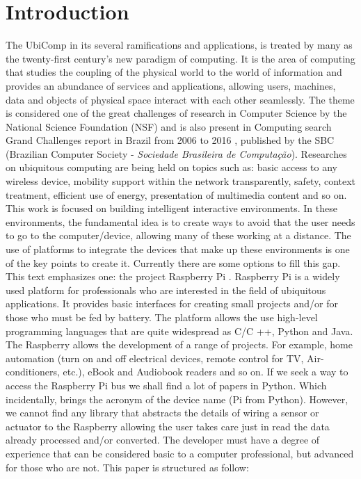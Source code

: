 \documentclass{acm_proc_article-sp}
\begin{document}
\section*{Introduction}
The UbiComp in its several ramifications and applications, is treated by many as the twenty-first century's new paradigm of computing. It is the area of computing that studies the coupling of the physical world to the world of information and provides an abundance of services and applications, allowing users, machines, data and objects of physical space interact with each other seamlessly. The theme is considered one of the great challenges of research in Computer Science by the National Science Foundation (NSF)\cite{Armstrong} and is also present in Computing search Grand Challenges report in Brazil from 2006 to 2016 \cite{carvalho2006grandes}, published by the SBC (Brazilian Computer Society - \textit{Sociedade Brasileira de Computa{\c{c}}{\~a}o}).
\newline
\newline
Researches on ubiquitous computing are being held on topics such as: basic access to any wireless device, mobility support within the network transparently, safety, context treatment, efficient use of energy, presentation of multimedia content and so on. This work is focused on building intelligent interactive environments. In these environments, the fundamental idea is to create ways to avoid that the user needs to go to the computer/device, allowing many of these working at a distance. The use of platforms to integrate the devices that make up these environments is one of the key points to create it. Currently there are some options to fill this gap. This text emphasizes one: the project Raspberry Pi \cite{Trapp,wirth2014making}.
\newline
\newline
Raspberry Pi is a widely used platform for professionals who are interested in the field of ubiquitous applications. It provides basic interfaces for creating small projects and/or for those who must be fed by battery. The platform allows the use high-level programming languages that are quite widespread as C/C ++, Python and Java. The Raspberry allows the development of a range of projects. For example, home automation (turn on and off electrical devices, remote control for TV, Air-conditioners, etc.), eBook and Audiobook readers and so on.
\newline
\newline
If we seek a way to access the Raspberry Pi bus we shall find a lot of papers in Python. Which incidentally, brings the acronym of the device name (Pi from Python). However, we cannot find any library that abstracts the details of wiring a sensor or actuator to the Raspberry allowing the user takes care just in read the data already processed and/or converted.
\newline
\newline
The developer must have a degree of experience that can be considered basic to a computer professional, but advanced for those who are not.
\newline
\newline 
This paper is structured as follow:
\end{document}
